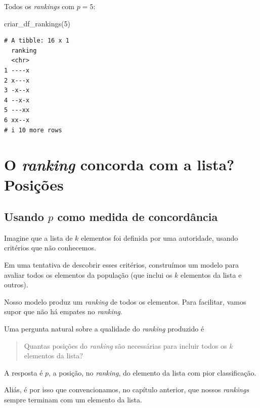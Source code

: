 \documentclass[
  letterpaper,
  DIV=11,
  numbers=noendperiod]{scrreprt}
\newenvironment{Shaded}{\begin{snugshade}}{\end{snugshade}}
\newcommand{\DecValTok}[1]{\textcolor[rgb]{0.68,0.00,0.00}{#1}}
\newcommand{\FunctionTok}[1]{\textcolor[rgb]{0.28,0.35,0.67}{#1}}
\newcommand{\NormalTok}[1]{\textcolor[rgb]{0.00,0.23,0.31}{#1}}
\begin{document}
Todos os \emph{rankings} com $p = 5$:

\begin{Shaded}
\begin{Highlighting}[]
\FunctionTok{criar\_df\_rankings}\NormalTok{(}\DecValTok{5}\NormalTok{)}
\end{Highlighting}
\end{Shaded}

\begin{verbatim}
# A tibble: 16 x 1
  ranking
  <chr>  
1 ----x  
2 x---x  
3 -x--x  
4 --x-x  
5 ---xx  
6 xx--x  
# i 10 more rows
\end{verbatim}


\chapter{\texorpdfstring{O \emph{ranking} concorda com a lista?
Posições}{O ranking concorda com a lista? Posições}}\label{o-ranking-concorda-com-a-lista-posiuxe7uxf5es}

\section{\texorpdfstring{Usando $p$ como medida de
concordância}{Usando  como medida de concordância}}\label{usando-p-como-medida-de-concorduxe2ncia}

Imagine que a lista de $k$ elementos foi definida por uma autoridade,
usando critérios que não conhecemos.

Em uma tentativa de descobrir esses critérios, construímos um modelo
para avaliar todos os elementos da população (que inclui os $k$
elementos da lista e outros).

Nosso modelo produz um \emph{ranking} de todos os elementos. Para
facilitar, vamos supor que não há empates no \emph{ranking}.

Uma pergunta natural sobre a qualidade do \emph{ranking} produzido é

\begin{quote}
Quantas posições do \emph{ranking} são necessárias para incluir todos os
$k$ elementos da lista?
\end{quote}

A resposta é $p$, a posição, no \emph{ranking}, do elemento da lista com
pior classificação.

Aliás, é por isso que convencionamos, no capítulo anterior, que nossos
\emph{rankings} sempre terminam com um elemento da lista.
\end{document}
